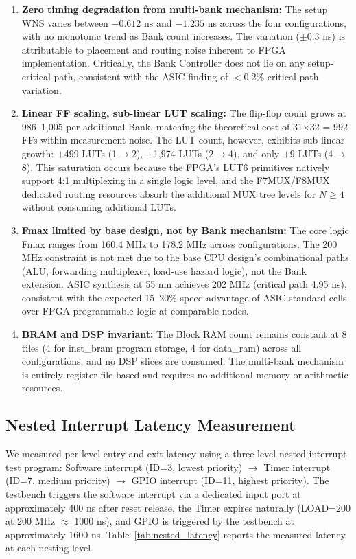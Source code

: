 \documentclass[letterpaper,journal]{IEEEtran}
\begin{document}
\begin{enumerate}
\item \textbf{Zero timing degradation from multi-bank mechanism:} The setup WNS varies between $-0.612$ ns and $-1.235$ ns across the four configurations, with no monotonic trend as Bank count increases. The variation ($\pm$0.3 ns) is attributable to placement and routing noise inherent to FPGA implementation. Critically, the Bank Controller does not lie on any setup-critical path, consistent with the ASIC finding of $<$0.2\% critical path variation.

\item \textbf{Linear FF scaling, sub-linear LUT scaling:} The flip-flop count grows at 986--1,005 per additional Bank, matching the theoretical cost of 31$\times$32 = 992 FFs within measurement noise. The LUT count, however, exhibits sub-linear growth: $+$499 LUTs (1$\rightarrow$2), $+$1,974 LUTs (2$\rightarrow$4), and only $+$9 LUTs (4$\rightarrow$8). This saturation occurs because the FPGA's LUT6 primitives natively support 4:1 multiplexing in a single logic level, and the F7MUX/F8MUX dedicated routing resources absorb the additional MUX tree levels for $N \geq 4$ without consuming additional LUTs.

\item \textbf{Fmax limited by base design, not by Bank mechanism:} The core logic Fmax ranges from 160.4 MHz to 178.2 MHz across configurations. The 200 MHz constraint is not met due to the base CPU design's combinational paths (ALU, forwarding multiplexer, load-use hazard logic), not the Bank extension. ASIC synthesis at 55 nm achieves 202 MHz (critical path 4.95 ns), consistent with the expected 15--20\% speed advantage of ASIC standard cells over FPGA programmable logic at comparable nodes.

\item \textbf{BRAM and DSP invariant:} The Block RAM count remains constant at 8 tiles (4 for inst\_bram program storage, 4 for data\_ram) across all configurations, and no DSP slices are consumed. The multi-bank mechanism is entirely register-file-based and requires no additional memory or arithmetic resources.
\end{enumerate}

\subsection{Nested Interrupt Latency Measurement}

We measured per-level entry and exit latency using a three-level nested interrupt test program: Software interrupt (ID=3, lowest priority) $\rightarrow$ Timer interrupt (ID=7, medium priority) $\rightarrow$ GPIO interrupt (ID=11, highest priority).
The testbench triggers the software interrupt via a dedicated input port at approximately 400 ns after reset release, the Timer expires naturally (LOAD=200 at 200 MHz $\approx$ 1000 ns), and GPIO is triggered by the testbench at approximately 1600 ns.
Table~\ref{tab:nested_latency} reports the measured latency at each nesting level.
\end{document}
